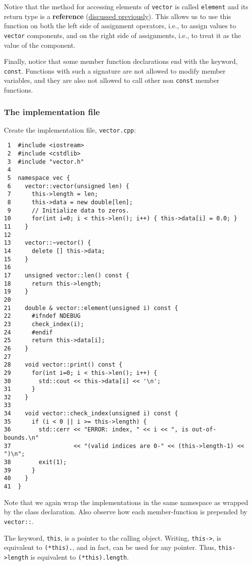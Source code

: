 \documentclass[11pt]{article}
\begin{document}
Notice that the method for accessing elements of \texttt{vector} is called \texttt{element} 
and its return type is a \textbf{reference} (\hyperref[sec:orgheadline19]{discussed previously}). This allows us 
to use this function on both the left side of assignment operators, i.e., to 
assign values to \texttt{vector} components, and on the right side of assignments, 
i.e., to treat it as the value of the component.

Finally, notice that some member function declarations end with the keyword, 
\texttt{const}. Functions with such a signature are not allowed to modify member 
variables, and they are also not allowed to call other non \texttt{const} member 
functions.

\subsubsection{The implementation file}
\label{sec:orgheadline50}
Create the implementation file, \texttt{vector.cpp}:

\begin{verbatim}
 1  #include <iostream>
 2  #include <cstdlib>
 3  #include "vector.h"
 4  
 5  namespace vec {
 6    vector::vector(unsigned len) {
 7      this->length = len;
 8      this->data = new double[len];
 9      // Initialize data to zeros.
10      for(int i=0; i < this->len(); i++) { this->data[i] = 0.0; }
11    }
12  
13    vector::~vector() {
14      delete [] this->data;
15    }
16  
17    unsigned vector::len() const {
18      return this->length;
19    }
20  
21    double & vector::element(unsigned i) const {
22      #ifndef NDEBUG
23      check_index(i);
24      #endif
25      return this->data[i];
26    }
27  
28    void vector::print() const {
29      for(int i=0; i < this->len(); i++) {
30        std::cout << this->data[i] << '\n';
31      }
32    }
33  
34    void vector::check_index(unsigned i) const {
35      if (i < 0 || i >= this->length) {
36        std::cerr << "ERROR: index, " << i << ", is out-of-bounds.\n"
37                  << "(valid indices are 0-" << (this->length-1) << ")\n";
38        exit(1);
39      }
40    }
41  }
\end{verbatim}

Note that we again wrap the implementations in the same namespace as wrapped 
by the class declaration. Also observe how each member-function is prepended 
by \texttt{vector::}.

The keyword, \texttt{this}, is a pointer to the calling object. Writing, \texttt{this->},
is equivalent to \texttt{(*this).}, and in fact, can be used for any pointer. Thus,
\texttt{this->length} is equivalent to \texttt{(*this).length}.
\end{document}

